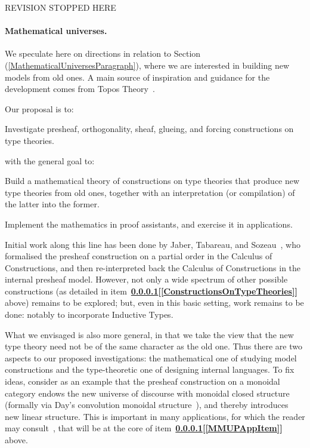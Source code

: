 \documentclass[11pt,twocolumn]{article}
\newcounter{CC}
\newenvironment{resenumerate}
  {\begin{list}{[\textbf{\arabic{CC}]}}
  {\usecounter{CC}
   \setlength{\topsep}{2pt}
   \setlength{\partopsep}{2pt}
   \setlength{\itemsep}{2.5pt}
   \setlength{\parsep}{2.5pt}
   \setlength{\leftmargin}{1.65em}
   \setlength{\labelwidth}{1.15em}
 }}
  {\end{list}}
\newcommand{\hideMathematicalUniverses}[1]{#1}
\newcommand{\pref}[1]{\,(\ref{#1})}
\newcommand{\itemref}[1]{\textbf{[\ref{#1}]}}
\begin{document}
{\color{red} REVISION STOPPED HERE}
\hideMathematicalUniverses{
\paragraph{Mathematical universes.}
\label{MethodologyMathematicalUniversesParagraph}

We speculate here on directions in relation to
Section\pref{MathematicalUniversesParagraph}, where we are interested in
building new models from old ones.  A main source of inspiration and
guidance for the development comes from Topos Theory~\cite{Elephant}.

Our proposal is to:
\begin{resenumerate}\setcounter{CC}{0}
\item\label{ConstructionsOnTypeTheories}
  Investigate presheaf, orthogonality, sheaf, glueing, and forcing
  constructions on type theories.
\end{resenumerate}
with the general goal to:
\begin{resenumerate}\setcounter{CC}{1}
\item
  Build a mathematical theory of constructions on type theories that
  produce new type theories from old ones, together with an interpretation
  (or compilation) of the latter into the former.
  
\item \label{MMUPAppItem}
  Implement the mathematics in proof assistants, and exercise it in
  applications.  
\end{resenumerate}

Initial work along this line has been done by Jaber, Tabareau, and
Sozeau~\cite{TypeTheoryWithForcing}, who formalised the presheaf
construction on a partial order in the Calculus of Constructions, and then
re-interpreted back the Calculus of Constructions in the internal presheaf
model.  However, not only a wide spectrum of other possible constructions
(as detailed in
item~\textbf{\ref{MethodologyMathematicalUniversesParagraph}}\thinspace\itemref{ConstructionsOnTypeTheories}
above) remains to be explored; but, even in this basic setting, work remains
to be done: notably to incorporate Inductive Types.

What we envisaged is also more general, in that we take the view that the
new type theory need not be of the same character as the old one.  Thus
there are two aspects to our proposed investigations: the mathematical one
of studying model constructions and the type-theoretic one of designing
internal languages.  To fix ideas, consider as an example that the
presheaf construction on a monoidal category endows the new universe of
discourse with monoidal closed structure (formally via Day's convolution
monoidal structure~\cite{Day}), and thereby introduces new linear structure.
This is important in many applications, for which the reader may
consult~\cite{FioreFossacs}, %
that will be at the core of
item~\mbox{\textbf{\ref{MethodologyMathematicalUniversesParagraph}}\thinspace\textbf{\itemref{MMUPAppItem}}}
above.

}
\end{document}
